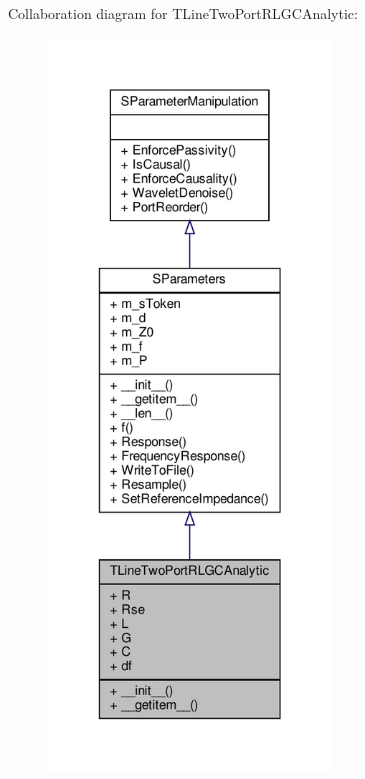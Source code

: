 Collaboration diagram for T\+Line\+Two\+Port\+R\+L\+G\+C\+Analytic\+:\nopagebreak
\begin{figure}[H]
\begin{center}
\leavevmode
\includegraphics[height=550pt]{classSignalIntegrity_1_1SParameters_1_1Devices_1_1TLineTwoPortRLGCAnalytic_1_1TLineTwoPortRLGCAnalytic__coll__graph}
\end{center}
\end{figure}
